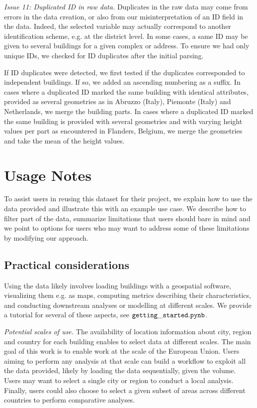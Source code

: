 \documentclass[fleqn,10pt]{wlscirep}
\begin{document}
\medskip \noindent \textit{Issue 11: Duplicated ID in raw data.} \hspace{0.1cm} Duplicates in the raw data may come from errors in the data creation, or also from our misinterpretation of an ID field in the data. Indeed, the selected variable may actually correspond to another identification scheme, e.g. at the district level. In some cases, a same ID may be given to several buildings for a given complex or address. To ensure we had only unique IDs, we checked for ID duplicates after the initial parsing. 

If ID duplicates were detected, we first tested if the duplicates corresponded to independent buildings. If so, we added an ascending numbering as a suffix. In cases where a duplicated ID marked the same building with identical attributes, provided as several geometries as in Abruzzo (Italy), Piemonte (Italy) and Netherlands, we merge the building parts. In cases where a duplicated ID marked the same building is provided with several geometries and with varying height values per part as encountered in Flanders, Belgium, we merge the geometries and take the mean of the height values.     


\section*{Usage Notes}
To assist users in reusing this dataset for their project, we explain how to use the data provided and illustrate this with an example use case. We describe how to filter part of the data, summarize limitations that users should bare in mind and we point to options for users who may want to address some of these limitations by modifying our approach.   

\subsection*{Practical considerations}
Using the data likely involves loading buildings with a geospatial software, visualizing them e.g. as maps, computing metrics describing their characteristics, and conducting downstream analyses or modelling at different scales. We provide a tutorial for several of these aspects, see ${\tt getting\_started.pynb}$\cite{eubucco-0.2-code2022}.


\medskip \noindent \textit{Potential scales of use.} \hspace{0.1cm}
The availability of location information about city, region and country for each building enables to select data at different scales. The main goal of this work is to enable work at the scale of the European Union. Users aiming to perform any analysis at that scale can build a workflow to exploit all the data provided, likely by loading the data sequentially, given the volume. 
Users may want to select a single city or region to conduct a local analysis. Finally, users could also choose to select a given subset of areas across different countries to perform comparative analyses.
\end{document}
